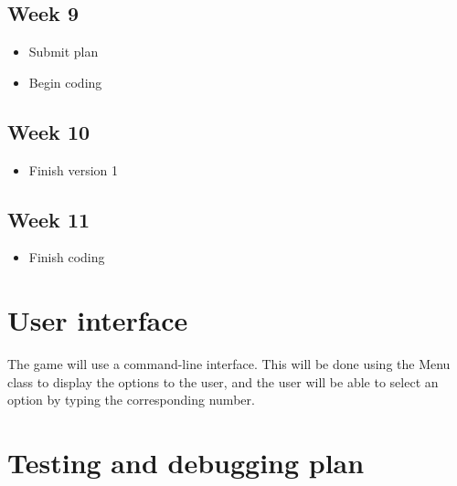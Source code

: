 \documentclass{article}
\begin{document}
  \subsection*{Week 9}
  \begin{itemize}
    \item Submit plan
    \item Begin coding
  \end{itemize}
  
  \subsection*{Week 10}
  \begin{itemize}
    \item Finish version 1
  \end{itemize}
  
  \subsection*{Week 11}
  \begin{itemize}
    \item Finish coding
  \end{itemize}
  
  \pagebreak
  
  \section{User interface}
  
  The game will use a command-line interface. This will be done using the Menu class to display the options to the user, and the user will be able to select an option by typing the corresponding number. 
  
  \section{Testing and debugging plan}
  
  \lipsum[1-2]
  
\end{document}
